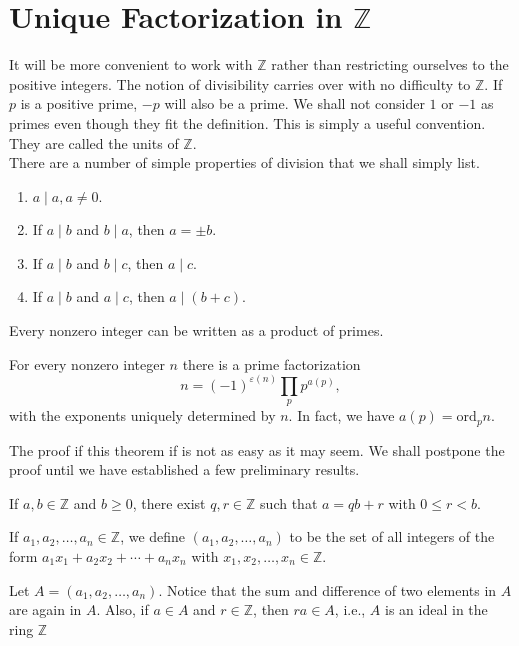 \section{Unique Factorization in $\mathbb{Z}$}
It will be more convenient to work with $\mathbb{Z}$ rather than restricting ourselves to the positive integers. The notion of divisibility carries over with no difficulty to $\mathbb{Z}$. If $p$ is a positive prime, $-p$ will also be a prime. We shall not consider $1$ or $-1$ as primes even though they fit the definition. This is simply a useful convention. They are called the units of $\mathbb{Z}$.\\There are a number of simple properties of division that we shall simply list.
\begin{enumerate}
\item $a\mid a,a\neq0$.
\item If $a\mid b$ and $b\mid a$, then $a=\pm b$.
\item If $a\mid b$ and $b\mid c$, then $a\mid c$.
\item If $a\mid b$ and $a\mid c$, then $a\mid (b+c)$.
\end{enumerate}
\begin{lemma}
Every nonzero integer can be written as a product of primes.
\end{lemma}
\begin{theorem}
For every nonzero integer $n$ there is a prime factorization$$n=(-1)^{\varepsilon(n)}\prod_pp^{a(p)},$$with the exponents uniquely determined by $n$. In fact, we have $a(p)=\mbox{ord}_pn$.
\end{theorem}
The proof if this theorem if is not as easy as it may seem. We shall postpone the proof until we have established a few preliminary results.
\begin{lemma}
If $a,b\in\mathbb{Z}$ and $b\ge0$, there exist $q,r\in\mathbb{Z}$ such that $a=qb+r$ with $0\leq r<b$.
\end{lemma}
\begin{definition}
If $a_1,a_2,\ldots,a_n\in\mathbb{Z}$, we define $(a_1,a_2,\ldots,a_n)$ to be the set of all integers of the form $a_1x_1+a_2x_2+\cdots+a_nx_n$ with $x_1,x_2,\ldots,x_n\in\mathbb{Z}$.
\end{definition}
\begin{remark}
Let $A = (a_1,a_2,\ldots,a_n)$. Notice that the sum and difference of two elements in $A$ are again in $A$. Also, if $a\in A$ and $r\in\mathbb{Z}$, then $ra\in A$, i.e., $A$ is an ideal in the ring $\mathbb{Z}$
\end{remark}
